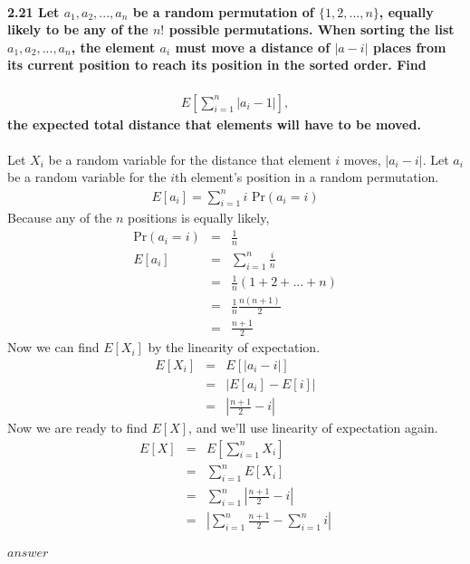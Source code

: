 \documentclass{article}
\begin{document}
\paragraph{2.21 Let $a_1, a_2, ..., a_n$ be a random permutation of 
$\{1, 2, ..., n\}$, equally likely to be any of the $n!$ possible permutations. 
When sorting the list $a_1, a_2, ..., a_n$, the element $a_i$ must move a 
distance of $|a-i|$ places from its current position to reach its 
position in the sorted order. Find}
\begin{eqnarray*}
E\left[\sum_{i=1}^n |a_i-1|\right],
\end{eqnarray*}
\textbf{the expected total distance that elements will have to be moved.\\\\}
Let $X_i$ be a random variable for the distance that element $i$ moves, 
$|a_i-i|$. Let $a_i$ be a random variable for the $i$th element's 
position in a random permutation.
\begin{eqnarray*}
E[a_i] = \sum_{i=1}^n i\mbox{ Pr}(a_i=i)
\end{eqnarray*}
Because any of the $n$ positions is equally likely,
\begin{eqnarray*}
\mbox{Pr}(a_i=i) & = & \frac{1}{n}\\
E[a_i] & = & \sum_{i=1}^n \frac{i}{n}\\
	& = & \frac{1}{n}(1+2+...+n)\\
	& = & \frac{1}{n}\frac{n(n+1)}{2}\\
	& = & \frac{n+1}{2}
\end{eqnarray*}
Now we can find $E[X_i]$ by the linearity of expectation.
\begin{eqnarray*}
E[X_i] & = & E[|a_i-i|]\\
	& = & |E[a_i]-E[i]|\\
	& = & \left|\frac{n+1}{2}-i\right|
\end{eqnarray*}
Now we are ready to find $E[X]$, and we'll use linearity of expectation again.
\begin{eqnarray*}
E[X] & = & E\left[\sum_{i=1}^n X_i\right]\\
	& = & \sum_{i=1}^n E[X_i]\\
	& = & \sum_{i=1}^n \left|\frac{n+1}{2}-i\right|\\
	& = & \left|\sum_{i=1}^n \frac{n+1}{2}-\sum_{i=1}^n i\right|\\
\end{eqnarray*}
\begin{center}
$\boxed{answer}$
\end{center}
\end{document}
